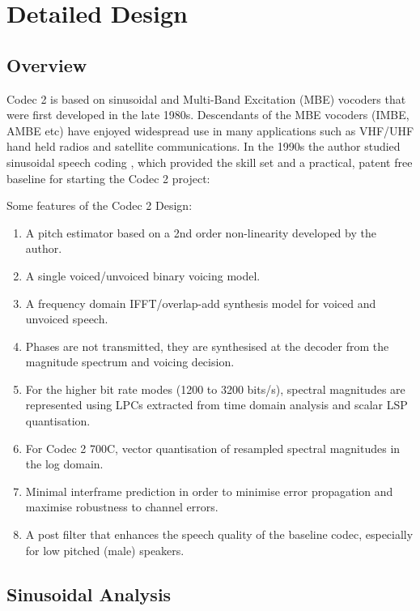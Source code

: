 \documentclass{article}
\begin{document}
\section{Detailed Design}
\label{sect:details}

\subsection{Overview}

Codec 2 is based on sinusoidal \cite{mcaulay1986speech} and Multi-Band Excitation (MBE) \cite{griffin1988multiband} vocoders that were first developed in the late 1980s.  Descendants of the MBE vocoders (IMBE, AMBE etc) have enjoyed widespread use in many applications such as VHF/UHF hand held radios and satellite communications. In the 1990s the author studied sinusoidal speech coding \cite{rowe1997techniques}, which provided the skill set and a practical, patent free baseline for starting the Codec 2 project:

Some features of the Codec 2 Design:
\begin{enumerate}
\item A pitch estimator based on a 2nd order non-linearity developed by the author.
\item A single voiced/unvoiced binary voicing model.
\item A frequency domain IFFT/overlap-add synthesis model for voiced and unvoiced speech.
\item Phases are not transmitted, they are synthesised at the decoder from the magnitude spectrum and voicing decision.  
\item For the higher bit rate modes (1200 to 3200 bits/s), spectral magnitudes are represented using LPCs extracted from time domain analysis and scalar LSP quantisation.
\item For Codec 2 700C, vector quantisation of resampled spectral magnitudes in the log domain.
\item Minimal interframe prediction in order to minimise error propagation and maximise robustness to channel errors.
\item A post filter that enhances the speech quality of the baseline codec, especially for low pitched (male) speakers.
\end{enumerate}

\subsection{Sinusoidal Analysis}
\end{document}
